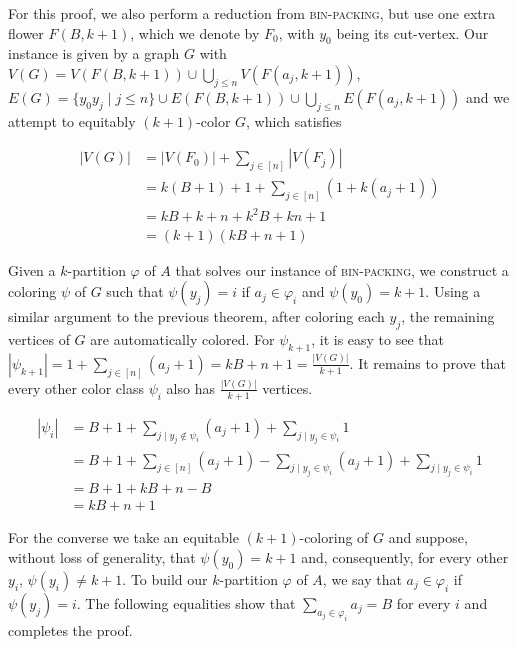 \begin{tproof}
    For this proof, we also perform a reduction from \textsc{bin-packing}, but use one extra flower $F(B, k+1)$, which we denote by $F_0$, with $y_0$ being its cut-vertex.
    Our instance is given by a graph $G$ with $V(G) = V(F(B, k+1)) \cup \bigcup_{j \leq n} V(F(a_j, k+1))$, $E(G) = \{y_0y_j \mid j \leq n\} \cup E(F(B, k+1)) \cup \bigcup_{j \leq n} E(F(a_j, k+1))$ and we attempt to equitably $(k+1)$-color $G$, which satisfies
    
    \begin{align*}
        |V(G)| &= |V(F_0)| + \sum_{j \in [n]} |V(F_j)|\\
               &= k(B + 1) + 1 + \sum_{j \in [n]} \left(1 + k(a_j + 1)\right)\\
               &= kB + k + n + k^2B + kn + 1\\ 
               &= (k+1)(kB + n + 1)
    \end{align*}
    
    Given a $k$-partition $\varphi$ of $A$ that solves our instance of \textsc{bin-packing}, we construct a coloring $\psi$ of $G$ such that $\psi(y_j) = i$ if $a_j \in \varphi_i$ and $\psi(y_0) = k+1$.
    Using a similar argument to the previous theorem, after coloring each $y_j$, the remaining vertices of $G$ are automatically colored.
    For $\psi_{k+1}$, it is easy to see that $|\psi_{k+1}| = 1 + \sum_{j \in [n]} (a_j + 1) = kB + n + 1 = \frac{|V(G)|}{k+1}$.
    It remains to prove that every other color class $\psi_i$ also has $\frac{|V(G)|}{k+1}$ vertices.
    
    \begin{align*}
        |\psi_i| &= B + 1 + \sum_{j \mid y_j \notin \psi_i} (a_j + 1) + \sum_{j \mid y_j \in \psi_i} 1\\
                 &= B + 1 + \sum_{j \in [n]} (a_j + 1) - \sum_{j \mid y_j \in \psi_i} (a_j + 1) + \sum_{j \mid y_j \in \psi_i} 1\\
                 &= B + 1 + kB + n - B\\
                 &= kB + n + 1
    \end{align*}
    
    For the converse we take an equitable $(k+1)$-coloring of $G$ and suppose, without loss of generality, that $\psi(y_0) = k+1$ and, consequently, for every other $y_i$, $\psi(y_i) \neq k+1$.
    To build our $k$-partition $\varphi$ of $A$, we say that $a_j \in \varphi_i$ if $\psi(y_j) = i$.
    The following equalities show that $\sum_{a_j \in \varphi_i} a_j = B$ for every $i$ and completes the proof.
    

\end{tproof}
